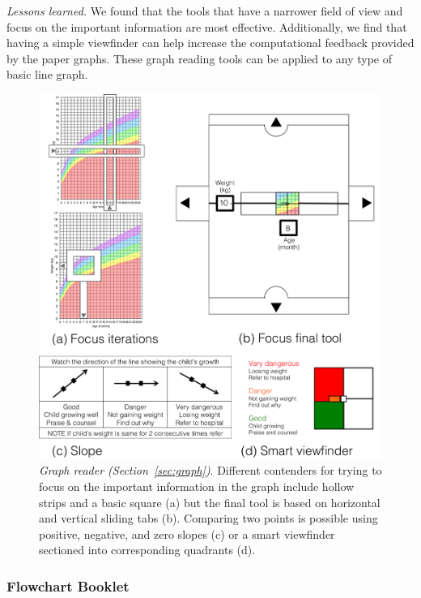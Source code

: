 \documentclass{sig-alternate}
\begin{document}
\emph{Lessons learned.}
We found that the tools that have a narrower field of view and focus on the important information are most effective. Additionally, we find that having a simple viewfinder can help increase the computational feedback provided by the paper graphs. 
These graph reading tools can be applied to any type of basic line graph. 


\begin{figure}
\centering
\includegraphics[width=\linewidth]{img/graph.png}
\caption{\emph{Graph reader (Section~\ref{sec:graph})}. Different contenders for trying to focus on the important information in the graph include hollow strips and a basic square (a) but the final tool is based on horizontal and vertical sliding tabs (b). Comparing two points is possible using positive, negative, and zero slopes (c) or a smart viewfinder sectioned into corresponding quadrants (d).}
\label{fig:graph}
\end{figure}

\subsubsection{Flowchart Booklet}
\label{sec:flowchart}
\end{document}
